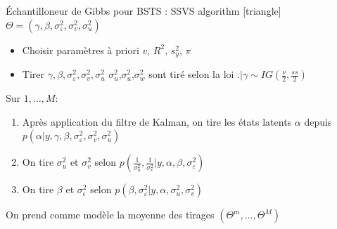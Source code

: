 \begin{frame}
    \small
\begin{exampleblock}{\'Echantilloneur de Gibbs pour BSTS : SSVS algorithm}
    [triangle]
    $\Theta=\left(\gamma, \beta, \sigma_{\varepsilon}^{2}, \sigma_{v}^{2}, \sigma_{u}^{2}\right)$
    \begin{itemize}
    \item Choisir paramètres à priori $v$, $R^2$, $s_y^2$, $\pi$ 
    \item Tirer $\gamma, \beta, \sigma_{\varepsilon}^{2}, \sigma_{v}^{2}, \sigma_{u}^{2}$ \hfill $\sigma_u^2$,$\sigma_u^2$,$\sigma_w^2$ sont tiré selon la loi $. | \gamma \sim I G\left(\frac{\nu}{2}, \frac{s s}{2}\right)$
    \end{itemize}
Sur $1, \ldots, M$:
\begin{enumerate}
\item Après application du filtre de Kalman, on tire les états latents $\alpha$ depuis $p\left(\alpha | y, \gamma, \beta, \sigma_{\varepsilon}^{2}, \sigma_{v}^{2}, \sigma_{u}^{2}\right)$
\item On tire $\sigma_u^2$ et $\sigma_v^2$ selon $p\left(\frac{1}{\sigma_{u}^{2}}, \frac{1}{\sigma_{v}^{2}} | y, \alpha, \beta, \sigma_{\varepsilon}^{2}\right)$
\item On tire $\beta$ et $\sigma_\epsilon^2$ selon $p\left(\beta, \sigma_{\varepsilon}^{2} | y, \alpha, \sigma_{u}^{2}, \sigma_{v}^{2}\right)$
\end{enumerate}

On prend comme modèle la moyenne des tirages $\left(\Theta^m, \ldots, \Theta^M\right)$

\end{exampleblock}

\end{frame}
